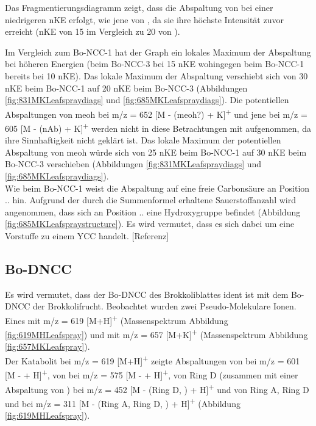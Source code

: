 Das Fragmentierungsdiagramm zeigt, dass die Abspaltung von  bei einer niedrigeren \gls{nKE} erfolgt, wie jene von , da sie ihre höchste Intensität zuvor erreicht (\gls{nKE} von 15 im Vergleich zu 20 von ). 

Im Vergleich zum Bo-NCC-1 hat der Graph ein lokales Maximum der  Abspaltung bei höheren Energien (beim Bo-NCC-3 bei 15 \gls{nKE} wohingegen beim Bo-NCC-1 bereits bei 10 \gls{nKE}). Das lokale Maximum der  Abspaltung verschiebt sich von 30 \gls{nKE} beim Bo-NCC-1 auf 20 \gls{nKE} beim Bo-NCC-3 (Abbildungen \ref{fig:831MKLeafspraydiags} und \ref{fig:685MKLeafspraydiags}). Die potentiellen Abspaltungen von \gls{meoh} bei m/z = 652 [M - (\gls{meoh}?) + K]\textsuperscript{+} und jene bei m/z = 605 [M - (\gls{nAb}) + K]\textsuperscript{+} werden nicht in diese Betrachtungen mit aufgenommen, da ihre Sinnhaftigkeit nicht geklärt ist. Das lokale Maximum der potentiellen Abspaltung von \gls{meoh} würde sich von 25 \gls{nKE} beim Bo-NCC-1 auf 30 \gls{nKE} beim Bo-NCC-3 verschieben (Abbildungen \ref{fig:831MKLeafspraydiags} und \ref{fig:685MKLeafspraydiags}).\\ 

Wie beim Bo-NCC-1 weist die  Abspaltung auf eine freie Carbonsäure an Position .. hin. Aufgrund der durch die Summenformel erhaltene Sauerstoffanzahl wird angenommen, dass sich an Position .. eine Hydroxygruppe befindet (Abbildung \ref{fig:685MKLeafspraystructure}). Es wird vermutet, dass es sich dabei um eine Vorstuffe zu einem \gls{YCC} handelt. [Referenz]

\subsection{Bo-DNCC}

Es wird vermutet, dass der Bo-DNCC des Brokkoliblattes ident ist mit dem Bo-DNCC der Brokkolifrucht. \cite{ChlorophyllCatabolitesBroccoli} Beobachtet wurden zwei Pseudo-Molekulare Ionen. Eines mit m/z = 619 [M+H]\textsuperscript{+} (Massenspektrum Abbildung \ref{fig:619MHLeafspray}) und mit m/z = 657 [M+K]\textsuperscript{+} (Massenspektrum Abbildung \ref{fig:657MKLeafspray}).\\

Der Katabolit bei m/z = 619 [M+H]\textsuperscript{+} zeigte Abspaltungen von  bei m/z = 601 [M -  + H]\textsuperscript{+}, von  bei m/z = 575 [M -  + H]\textsuperscript{+}, von Ring D (zusammen mit einer Abspaltung von ) bei m/z = 452 [M - (Ring D, ) + H]\textsuperscript{+} und von Ring A, Ring D und  bei m/z = 311 [M - (Ring A, Ring D, ) + H]\textsuperscript{+} (Abbildung \ref{fig:619MHLeafspray}).


